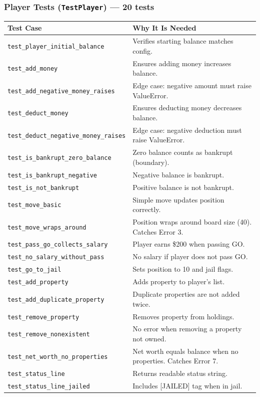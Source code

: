 \documentclass[12pt,a4paper]{article}
\begin{document}
\subsubsection{Player Tests (\texttt{TestPlayer}) --- 20 tests}
\begin{longtable}{p{5.8cm} p{6.2cm}}
\toprule
\textbf{Test Case} & \textbf{Why It Is Needed} \\
\midrule
\texttt{test\_player\_initial\_balance} & Verifies starting balance matches config. \\
\texttt{test\_add\_money} & Ensures adding money increases balance. \\
\texttt{test\_add\_negative\_money\_raises} & Edge case: negative amount must raise ValueError. \\
\texttt{test\_deduct\_money} & Ensures deducting money decreases balance. \\
\texttt{test\_deduct\_negative\_money\_raises} & Edge case: negative deduction must raise ValueError. \\
\texttt{test\_is\_bankrupt\_zero\_balance} & Zero balance counts as bankrupt (boundary). \\
\texttt{test\_is\_bankrupt\_negative} & Negative balance is bankrupt. \\
\texttt{test\_is\_not\_bankrupt} & Positive balance is not bankrupt. \\
\texttt{test\_move\_basic} & Simple move updates position correctly. \\
\texttt{test\_move\_wraps\_around} & Position wraps around board size (40). Catches Error 3. \\
\texttt{test\_pass\_go\_collects\_salary} & Player earns \$200 when passing GO. \\
\texttt{test\_no\_salary\_without\_pass} & No salary if player does not pass GO. \\
\texttt{test\_go\_to\_jail} & Sets position to 10 and jail flags. \\
\texttt{test\_add\_property} & Adds property to player's list. \\
\texttt{test\_add\_duplicate\_property} & Duplicate properties are not added twice. \\
\texttt{test\_remove\_property} & Removes property from holdings. \\
\texttt{test\_remove\_nonexistent} & No error when removing a property not owned. \\
\texttt{test\_net\_worth\_no\_properties} & Net worth equals balance when no properties. Catches Error 7. \\
\texttt{test\_status\_line} & Returns readable status string. \\
\texttt{test\_status\_line\_jailed} & Includes [JAILED] tag when in jail. \\
\bottomrule
\end{longtable}
\end{document}
